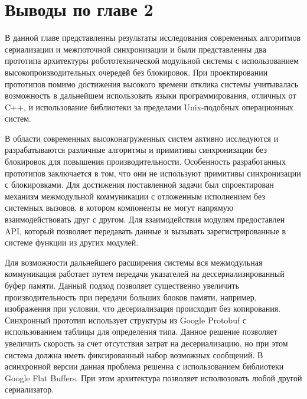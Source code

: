\section*{Выводы по главе 2}

В данной главе представленны результаты исследования современных алгоритмов 
сериализации и межпоточной синхронизации и были представленны два прототипа 
архитектуры робототехнической модульной системы с использованием 
высокопроизводительных очередей без блокировок. При проектировании прототипов 
помимо достижения высокого времени отклика системы учитывалась возможность в 
дальнейшем использовать языки программирования, отличных от C++, и 
использование библиотеки за пределами Unix-подобных операционных систем.

В области современных высоконагруженных систем активно исследуются и разрабатываются различные алгоритмы и примитивы синхронизации без блокировок для повышения производительности.  Особенность разработанных прототипов заключается в том, что они не используют примитивы синхронизации с блокировками. Для достижения поставленной задачи был спроектирован механизм межмодульной коммуникации с отложенным исполнением без системных вызовов, в котором компоненты не могут напрямую взаимодействовать друг с другом. Для взаимодействия модулям предоставлен API, который позволяет передавать данные и вызывать зарегистрированные в системе функции из других модулей.

Для возможности дальнейшего расширения системы вся межмодульная коммуникация работает путем передачи указателей на дессериализированный буфер памяти. Данный подход позволяет существенно увеличить производительность при передачи больших блоков памяти, например, изображения при условии, что десериализация происходит без копирования. Синхронный прототип использует структуры из Google Protobuf с использованием таблицы для определения типа. Данное решение позволяет увеличить скорость за счет отсутствия затрат на десериализацию, но при этом система должна иметь фиксированный набор возможных сообщений. В асинхронной версии данная проблема решенна с использованием библиотеки Google Flat Buffers. При этом архитектура позволяет исполюзовать любой другой сериализатор.